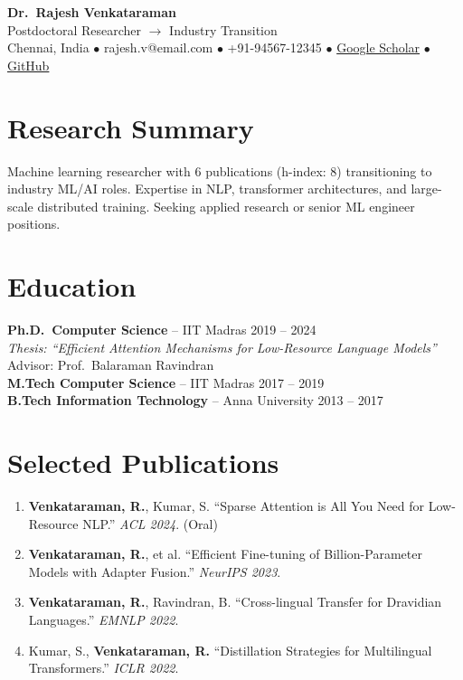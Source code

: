 \documentclass[11pt,letterpaper]{article}
\begin{document}
\begin{center}
{\LARGE\bfseries Dr.\ Rajesh Venkataraman}\\[4pt]
{\small Postdoctoral Researcher $\rightarrow$ Industry Transition}\\[4pt]
{\footnotesize Chennai, India \quad $\bullet$ \quad rajesh.v@email.com \quad $\bullet$ \quad +91-94567-12345 \quad $\bullet$ \quad \href{https://scholar.google.com}{Google Scholar} \quad $\bullet$ \quad \href{https://github.com/rajeshv}{GitHub}}
\end{center}

\section{Research Summary}
Machine learning researcher with 6 publications (h-index: 8) transitioning to industry ML/AI roles. Expertise in NLP, transformer architectures, and large-scale distributed training. Seeking applied research or senior ML engineer positions.

\section{Education}
\textbf{Ph.D.\ Computer Science} -- IIT Madras \hfill 2019 -- 2024\\
\textit{Thesis: ``Efficient Attention Mechanisms for Low-Resource Language Models''}\\
Advisor: Prof.\ Balaraman Ravindran\\[4pt]
\textbf{M.Tech Computer Science} -- IIT Madras \hfill 2017 -- 2019\\[2pt]
\textbf{B.Tech Information Technology} -- Anna University \hfill 2013 -- 2017

\section{Selected Publications}
\begin{enumerate}[leftmargin=2em,itemsep=3pt]
\item \textbf{Venkataraman, R.}, Kumar, S. ``Sparse Attention is All You Need for Low-Resource NLP.'' \textit{ACL 2024}. (Oral)
\item \textbf{Venkataraman, R.}, et al. ``Efficient Fine-tuning of Billion-Parameter Models with Adapter Fusion.'' \textit{NeurIPS 2023}.
\item \textbf{Venkataraman, R.}, Ravindran, B. ``Cross-lingual Transfer for Dravidian Languages.'' \textit{EMNLP 2022}.
\item Kumar, S., \textbf{Venkataraman, R.} ``Distillation Strategies for Multilingual Transformers.'' \textit{ICLR 2022}.
\end{enumerate}
\end{document}
